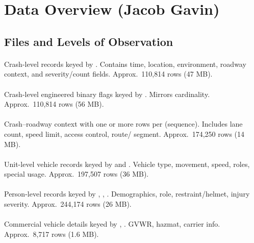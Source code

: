 \documentclass[journal]{IEEEtran}
\begin{document}
\section{Data Overview (Jacob Gavin)}

\subsection{Files and Levels of Observation}

\paragraph{}
Crash-level records keyed by . Contains time, location, environment, roadway context, and severity/count fields. Approx.\
110,814 rows (47 MB).

\paragraph{}
Crash-level engineered binary flags keyed by . Mirrors  cardinality. Approx.\ 110,814 rows (56 MB).

\paragraph{}
Crash–roadway context with one or more rows per  (sequence). Includes lane count, speed limit, access control, route/
segment. Approx.\ 174,250 rows (14 MB).

\paragraph{}
Unit-level vehicle records keyed by  and . Vehicle type, movement, speed, roles, special usage. Approx.\
197,507 rows (36 MB).

\paragraph{}
Person-level records keyed by , , . Demographics, role, restraint/helmet, injury severity.
Approx.\ 244,174 rows (26 MB).

\paragraph{}
Commercial vehicle details keyed by , . GVWR, hazmat, carrier info. Approx.\ 8,717 rows (1.6 MB).
\end{document}
